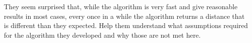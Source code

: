 \documentclass[12pt]{article}
\begin{document}
\pagebreak
They seem surprised that, while the algorithm is very fast and give reasonable
results in most cases, every once in a while the algorithm returns a distance
that is different than they expected. Help them understand what assumptions
required for the algorithm they developed and why those are not met here.

\pagebreak

\newpage
\mbox{}
\newpage
\pagebreak
\end{document}

